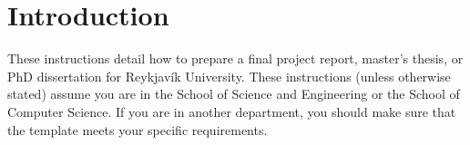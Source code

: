 






\newcommand{\TIheadofgrad}{Eyjólfur Ingi Ásgeirsson~\formatemail{eyjolfur AT ru.is} or TD Person}
\newcommand{\TItvdadmin}{Sigrún Þorgeirsdóttir~\formatemail{sigrunth AT ru.is}}


\section{Introduction} %
These instructions detail how to prepare a final project report, master's thesis, or PhD dissertation for Reykjavík University.
These instructions (unless otherwise stated) assume you are in the School of Science and Engineering or the School of Computer Science.
If you are in another department, you should make sure that the template meets your specific requirements.

